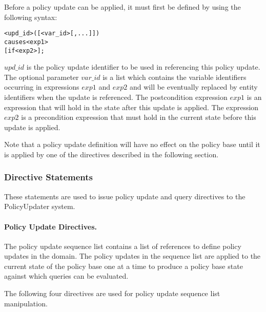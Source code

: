 \documentclass[glov2,twocolumn,final]{svjour2}
\newenvironment{vverbatim}
  {\begin{alltt}}
  {\vspace{-\baselineskip}\end{alltt}}
\begin{document}
          Before a policy update can be applied, it must first be defined by
          using the following syntax:

          \begin{vverbatim}
  <upd\_id>([<var\_id>[, ...]])
    causes <exp1>
    [if <exp2>];
          \end{vverbatim}

          $upd\_id$ is the policy update identifier to be used in referencing
          this policy update. The optional parameter $var\_id$ is a list which
          contains the variable identifiers occurring in expressions $exp1$
          and $exp2$ and will be eventually replaced by entity identifiers when
          the update is referenced. The postcondition expression $exp1$ is an
          expression that will hold in the state after this update is applied.
          The expression $exp2$ is a precondition expression that must hold in
          the current state before this update is applied.

          Note that a policy update definition will have no effect on the
          policy base until it is applied by one of the directives described in
          the following section.

        \subsubsection{Directive Statements}

          These statements are used to issue policy update and query directives
          to the PolicyUpdater system.

        \paragraph{Policy Update Directives.}

        The policy update sequence list contains a list of references to
        define policy updates in the domain. The policy updates in the
        sequence list are applied to the current state of the policy base one
        at a time to produce a policy base state against which queries can be
        evaluated.

        The following four directives are used for policy update sequence list
        manipulation.
\end{document}
